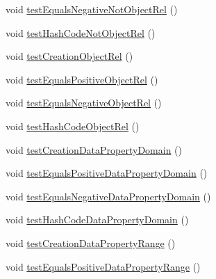 \begin{DoxyCompactItemize}
void \hyperlink{classorg_1_1semanticweb_1_1owlapi_1_1datafactory_1_1_o_w_l_data_factory_test_case_a201df02e176ffa9ce494efb83d6af924}{test\-Equals\-Negative\-Not\-Object\-Rel} ()
\item 
void \hyperlink{classorg_1_1semanticweb_1_1owlapi_1_1datafactory_1_1_o_w_l_data_factory_test_case_a723c6ad6ec941dd0648972670adfb81e}{test\-Hash\-Code\-Not\-Object\-Rel} ()
\item 
void \hyperlink{classorg_1_1semanticweb_1_1owlapi_1_1datafactory_1_1_o_w_l_data_factory_test_case_a332f0034bdeccdee3e275e14b61ec1c4}{test\-Creation\-Object\-Rel} ()
\item 
void \hyperlink{classorg_1_1semanticweb_1_1owlapi_1_1datafactory_1_1_o_w_l_data_factory_test_case_aa8b6c0b3b3dccc7c46ad4b4684f819c7}{test\-Equals\-Positive\-Object\-Rel} ()
\item 
void \hyperlink{classorg_1_1semanticweb_1_1owlapi_1_1datafactory_1_1_o_w_l_data_factory_test_case_a53e7544dbabb3e9b685a3e720b1e99ec}{test\-Equals\-Negative\-Object\-Rel} ()
\item 
void \hyperlink{classorg_1_1semanticweb_1_1owlapi_1_1datafactory_1_1_o_w_l_data_factory_test_case_abf2b316c7d4899ecd501068535b128c5}{test\-Hash\-Code\-Object\-Rel} ()
\item 
void \hyperlink{classorg_1_1semanticweb_1_1owlapi_1_1datafactory_1_1_o_w_l_data_factory_test_case_a764b06fff2adc92c9f3575afd9433477}{test\-Creation\-Data\-Property\-Domain} ()
\item 
void \hyperlink{classorg_1_1semanticweb_1_1owlapi_1_1datafactory_1_1_o_w_l_data_factory_test_case_a545ca189a12ed2a599e7180c5275984d}{test\-Equals\-Positive\-Data\-Property\-Domain} ()
\item 
void \hyperlink{classorg_1_1semanticweb_1_1owlapi_1_1datafactory_1_1_o_w_l_data_factory_test_case_a3ae33a79776f51c23257d31c4d63b7fa}{test\-Equals\-Negative\-Data\-Property\-Domain} ()
\item 
void \hyperlink{classorg_1_1semanticweb_1_1owlapi_1_1datafactory_1_1_o_w_l_data_factory_test_case_a9d17699264fd315dd6b4724125585752}{test\-Hash\-Code\-Data\-Property\-Domain} ()
\item 
void \hyperlink{classorg_1_1semanticweb_1_1owlapi_1_1datafactory_1_1_o_w_l_data_factory_test_case_aa57705edae1ea092203e42d92bac8a6a}{test\-Creation\-Data\-Property\-Range} ()
\item 
void \hyperlink{classorg_1_1semanticweb_1_1owlapi_1_1datafactory_1_1_o_w_l_data_factory_test_case_aece92566f5541747d7900bcc73a498c2}{test\-Equals\-Positive\-Data\-Property\-Range} ()

\end{DoxyCompactItemize}
